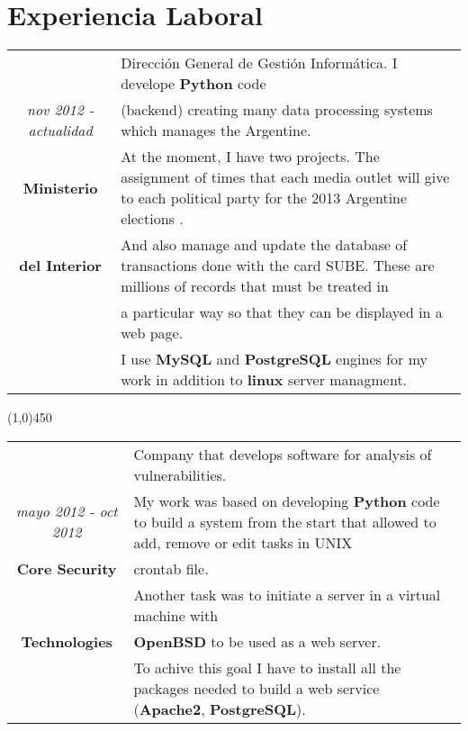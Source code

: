 \section{Experiencia Laboral}

\begin{tabular}{c|p{12.5cm}}
& \large Dirección General de Gestión Informática. I develope \textbf{Python} code\\
\large\textit{nov 2012 - actualidad} &  \large  (backend) creating many data processing systems which manages the Argentine.\\
\large\textbf{Ministerio} & \large  At the moment, I have two projects. The assignment of times that each media outlet will give to each political party for the 2013 Argentine elections .\\
\large\textbf{del Interior} & \large And also manage and update the database of transactions done with the card SUBE. These are millions of records that must be treated in \\
& \large a particular way so that they can be displayed in a web page.\\
& \large I use \textbf{MySQL} and \textbf{PostgreSQL} engines for my work in addition to \textbf{linux} server managment.\\
\end{tabular}

\begin{center}
\line(1,0){450}
\end{center}
\begin{tabular}{c|p{12.5cm}}
& \large Company that develops software for analysis of vulnerabilities.\\
\large\textit{mayo 2012 - oct 2012} &  \large My work was based on developing \textbf{Python} code to build a system from the start that allowed to add, remove or edit tasks in UNIX\\
\large\textbf{Core Security} & \large  crontab file.\\
 & \large  Another task was to initiate a server in a virtual machine with \\
\large\textbf{Technologies} & \large\textbf{OpenBSD} to be used as a web server. \\
& \large To achive this goal I have to install all the packages needed to build a web service (\textbf{Apache2}, \textbf{PostgreSQL}). \\
\end{tabular}

